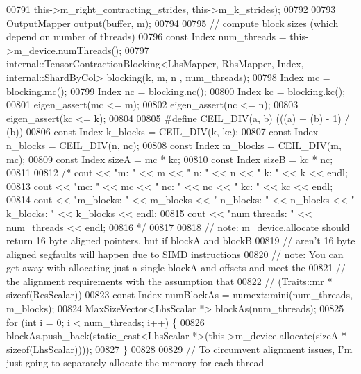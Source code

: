 \begin{DoxyCode}
00791                   this->m\_right\_contracting\_strides, this->m\_k\_strides);
00792 
00793     OutputMapper output(buffer, m);
00794 
00795     \textcolor{comment}{// compute block sizes (which depend on number of threads)}
00796     \textcolor{keyword}{const} Index num\_threads = this->m\_device.numThreads();
00797     internal::TensorContractionBlocking<LhsMapper, RhsMapper, Index, internal::ShardByCol> blocking(k, m, n
      , num\_threads);
00798     Index mc = blocking.mc();
00799     Index nc = blocking.nc();
00800     Index kc = blocking.kc();
00801     eigen\_assert(mc <= m);
00802     eigen\_assert(nc <= n);
00803     eigen\_assert(kc <= k);
00804 
00805 \textcolor{preprocessor}{#define CEIL\_DIV(a, b) (((a) + (b) - 1) / (b))}
00806     \textcolor{keyword}{const} Index k\_blocks = CEIL\_DIV(k, kc);
00807     \textcolor{keyword}{const} Index n\_blocks = CEIL\_DIV(n, nc);
00808     \textcolor{keyword}{const} Index m\_blocks = CEIL\_DIV(m, mc);
00809     \textcolor{keyword}{const} Index sizeA = mc * kc;
00810     \textcolor{keyword}{const} Index sizeB = kc * nc;
00811 
00812     \textcolor{comment}{/*    cout << "m: " << m << " n: " << n << " k: " << k << endl;}
00813 \textcolor{comment}{    cout << "mc: " << mc << " nc: " << nc << " kc: " << kc << endl;}
00814 \textcolor{comment}{    cout << "m\_blocks: " << m\_blocks << " n\_blocks: " << n\_blocks << " k\_blocks: " << k\_blocks << endl;}
00815 \textcolor{comment}{    cout << "num threads: " << num\_threads << endl;}
00816 \textcolor{comment}{    */}
00817 
00818     \textcolor{comment}{// note: m\_device.allocate should return 16 byte aligned pointers, but if blockA and blockB}
00819     \textcolor{comment}{//       aren't 16 byte aligned segfaults will happen due to SIMD instructions}
00820     \textcolor{comment}{// note: You can get away with allocating just a single blockA and offsets and meet the}
00821     \textcolor{comment}{//       the alignment requirements with the assumption that}
00822     \textcolor{comment}{//       (Traits::mr * sizeof(ResScalar)) %
00823     \textcolor{keyword}{const} Index numBlockAs = numext::mini(num\_threads, m\_blocks);
00824     MaxSizeVector<LhsScalar *> blockAs(num\_threads);
00825     \textcolor{keywordflow}{for} (\textcolor{keywordtype}{int} i = 0; i < num\_threads; i++) \{
00826       blockAs.push\_back(static\_cast<LhsScalar *>(this->m\_device.allocate(sizeA * \textcolor{keyword}{sizeof}(LhsScalar))));
00827     \}
00828 
00829     \textcolor{comment}{// To circumvent alignment issues, I'm just going to separately allocate the memory for each thread}
}
\end{DoxyCode}

